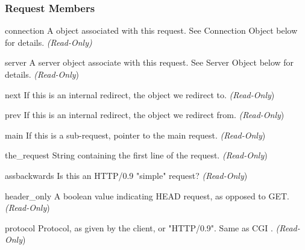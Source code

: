 \subsubsection{Request Members\label{pyapi-mprequest-mem}}

\begin{memberdesc}[Request]{connection}
A  object associated with this request. See
Connection Object below for details.
\emph{(Read-Only)}
\end{memberdesc}

\begin{memberdesc}[Request]{server}
A server object associate with this request. See Server Object below
for details.
\emph{(Read-Only})
\end{memberdesc}

\begin{memberdesc}[Request]{next}
If this is an internal redirect, the  object we redirect to. 
\emph{(Read-Only})
\end{memberdesc}

\begin{memberdesc}[Request]{prev}
If this is an internal redirect, the  object we redirect from.
\emph{(Read-Only})
\end{memberdesc}

\begin{memberdesc}[Request]{main}
If this is a sub-request, pointer to the main request. 
\emph{(Read-Only})
\end{memberdesc}

\begin{memberdesc}[Request]{the_request}
String containing the first line of the request.
\emph{(Read-Only})
\end{memberdesc}

\begin{memberdesc}[Request]{assbackwards}
Is this an HTTP/0.9 "simple" request? 
\emph{(Read-Only})
\end{memberdesc}

\begin{memberdesc}[Request]{header_only}
A boolean value indicating HEAD request, as opposed to GET. 
\emph{(Read-Only})
\end{memberdesc}

\begin{memberdesc}[Request]{protocol}
Protocol, as given by the client, or "HTTP/0.9". Same as CGI .
\emph{(Read-Only})
\end{memberdesc}

